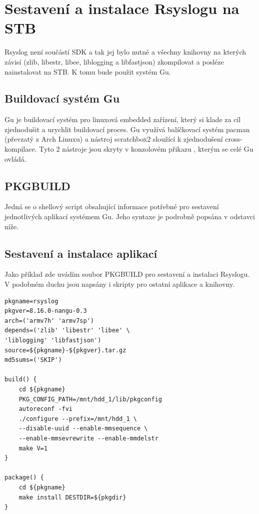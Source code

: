 \documentclass[thesis=B,czech]{FITthesis}[2012/06/26]
\begin{document}
\section{Sestavení a instalace Rsyslogu na STB}
 
Rsyslog není součástí SDK a tak jej bylo nutné a všechny knihovny na kterých závisí (zlib, libestr, libee, liblogging a libfastjson) zkompilovat a posléze nainstalovat na STB. K tomu bude použit systém Gu.

\subsection{Buildovací systém Gu}
Gu je buildovací systém pro linuxová embedded zařízení, který si klade za cíl zjednodušit a urychlit buildovací proces. Gu využívá balíčkovací systém pacman (převzatý z Arch Linuxu) a nástroj scratchbox2 sloužící k zjednodušení cross-kompilace. Tyto 2 nástroje jsou skryty v konzolovém přikazu , kterým se celé Gu ovládá.

\subsection{PKGBUILD}
Jedná se o shellový script obsahující informace potřebné pro sestavení jednotlivých aplikací systémem Gu. Jeho syntaxe je podrobně popsána v odstavci níže.

\subsection{Sestavení a instalace aplikací}
Jako příklad zde uvádím soubor PKGBUILD pro sestavení a instalaci Rsyslogu. V podobném duchu jsou napsány i skripty pro ostatní aplikace a knihovny.
\begin{lstlisting}
pkgname=rsyslog
pkgver=8.16.0-nangu-0.3
arch=('armv7h' 'armv7sp')
depends=('zlib' 'libestr' 'libee' \
'liblogging' 'libfastjson')
source=${pkgname}-${pkgver}.tar.gz
md5sums=('SKIP')

build() {
	cd ${pkgname}
	PKG_CONFIG_PATH=/mnt/hdd_1/lib/pkgconfig
	autoreconf -fvi
	./configure --prefix=/mnt/hdd_1 \
	--disable-uuid --enable-mmsequence \
	--enable-mmsevrewrite --enable-mmdelstr
	make V=1
}

package() {
	cd ${pkgname}
	make install DESTDIR=${pkgdir}
}
\end{lstlisting}
\end{document}
